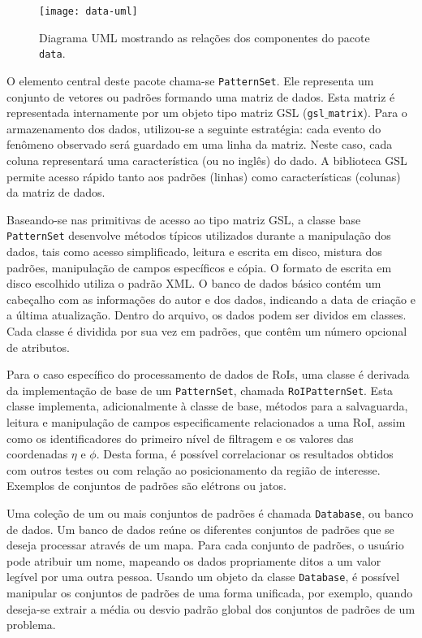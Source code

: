 \begin{figure}
\begin{center}
\texttt{[image: data-uml]}
\end{center}
\caption{Diagrama UML mostrando as relações dos componentes do pacote
\texttt{data}.}
\label{fig:data-uml}
\end{figure}

O elemento central deste pacote chama-se \texttt{PatternSet}. Ele representa
um conjunto de vetores ou padrões formando uma matriz de dados. Esta matriz é
representada internamente por um objeto tipo matriz GSL
(\texttt{gsl$\_$matrix}). Para o armazenamento dos dados, utilizou-se a
seguinte estratégia: cada evento do fenômeno observado será guardado em uma
linha da matriz. Neste caso, cada coluna representará uma característica (ou
 no inglês) do dado. A biblioteca GSL permite acesso rápido tanto
aos padrões (linhas) como características (colunas) da matriz de dados. 

Baseando-se nas primitivas de acesso ao tipo matriz GSL, a classe base
\texttt{PatternSet} desenvolve mé\-todos tí\-picos utilizados durante a
manipulação dos dados, tais como acesso simplificado, leitura e escrita em
disco, mistura dos padrões, manipulação de campos específicos e cópia. O
formato de escrita em disco escolhido utiliza o padrão XML. O banco de dados
básico contém um cabeçalho com as informações do autor e dos dados, indicando
a data de criação e a última atualização. Dentro do arquivo, os dados podem
ser dividos em classes. Cada classe é dividida por sua vez em padrões, que
contêm um número opcional de atributos.

Para o caso específico do processamento de dados de RoIs, uma classe é
derivada da implementação de base de um \texttt{PatternSet}, chamada
\texttt{RoIPatternSet}. Esta classe implementa, adicionalmente à classe de
base, métodos para a salvaguarda, leitura e manipulação de campos
especificamente relacionados a uma RoI, assim como os identificadores do
primeiro nível de filtragem e os valores das coordenadas $\eta$ e $\phi$.
Desta forma, é possível correlacionar os resultados obtidos com outros testes
ou com relação ao posicionamento da região de interesse. Exemplos de conjuntos
de padrões são elétrons ou jatos.

Uma coleção de um ou mais conjuntos de padrões é chamada \texttt{Database}, ou
banco de dados. Um banco de dados reúne os diferentes conjuntos de padrões que
se deseja processar através de um mapa. Para cada conjunto de padrões, o
usuário pode atribuir um nome, mapeando os dados propriamente ditos a um valor
legível por uma outra pessoa. Usando um objeto da classe \texttt{Database}, é
possível manipular os conjuntos de padrões de uma forma unificada, por
exemplo, quando deseja-se extrair a média ou desvio padrão global dos
conjuntos de padrões de um problema.

